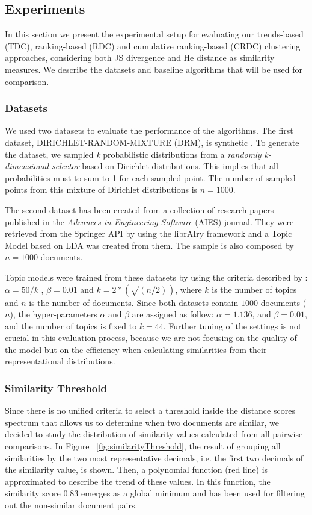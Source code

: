 \subsection{Experiments}
\label{sec:clustering-experiments}
In this section we present the experimental setup for evaluating our trends-based (TDC), ranking-based (RDC) and cumulative ranking-based (CRDC) clustering approaches, considering both JS divergence and He distance as similarity measures. We describe the datasets and baseline algorithms that will be used for comparison.

\subsubsection{Datasets}
\label{sec:clustering-datasets}
We used two datasets to evaluate the performance of the algorithms. The first dataset, DIRICHLET-RANDOM-MIXTURE (DRM), is synthetic \citep{Badenes-Olmedo2017a}. To generate the dataset, we sampled \textit{k} probabilistic distributions from a \textit{randomly k-dimensional selector} based on Dirichlet distributions. This implies that all probabilities must to sum to 1 for each sampled point. The number of sampled points from this mixture of Dirichlet distributions is $n=1000$.

The second dataset has been created from a collection of research papers published in the \textit{Advances in Engineering Software} (AIES) journal. They were retrieved from the Springer API by using the librAIry \citep{Badenes-Olmedo2017} framework and a Topic Model based on LDA was created from them. The sample is also composed by $n=1000$ documents.

Topic models were trained from these datasets by using the criteria described by \citep{Steyvers2006}: $\alpha= 50/k$ , $\beta= 0.01$ and $k=2*(\sqrt{(n/2)})$, where $k$ is the number of topics and $n$ is the number of documents. Since both datasets contain $1000$ documents ($n$), the hyper-parameters $\alpha$ and $\beta$ are assigned as follow: $\alpha=1.136$, and $\beta=0.01$, and the number of topics is fixed to $k=44$. Further tuning of the settings is not crucial in this evaluation process, because we are not focusing on the quality of the model but on the efficiency when calculating similarities from their representational distributions.

\subsubsection{Similarity Threshold}
\label{sec:clustering-threshold}
Since there is no unified criteria to select a threshold inside the distance scores spectrum that allows us to determine when two documents are similar, we decided to study the distribution of similarity values calculated from all pairwise comparisons. In Figure ~\ref{fig:similarityThreshold}, the result of grouping all similarities by the two most representative decimals, i.e. the first two decimals of the similarity value, is shown. Then, a polynomial function (red line) is approximated to describe the trend of these values. In this function, the similarity score $0.83$ emerges as a global minimum and has been used for filtering out the non-similar document pairs.

